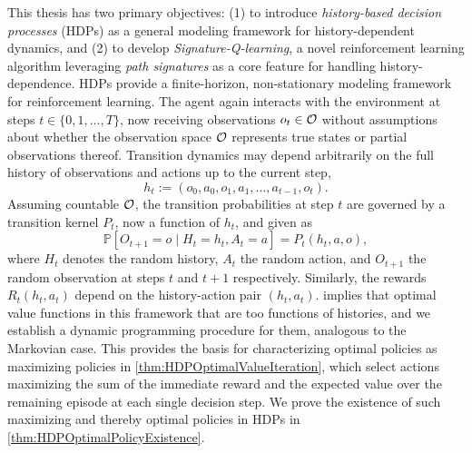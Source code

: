 \documentclass[
    a4paper,
    11pt,
    bibliography=totoc,
    listof=totoc,      
    headinclude=true,
    cleardoublepage=empty,
]{scrbook}
\theoremstyle{plain}
\theoremstyle{definition}
\theoremstyle{remark}
\newcommand{\PM}{\mathbb P}
\newcommand{\SpaceO}{{\cal O}}
\begin{document}
This thesis has two primary objectives: (1) to introduce \textit{history-based 
decision processes} (HDPs) as a general modeling framework for 
history-dependent dynamics, and (2) to develop \textit{Signature-Q-learning}, a 
novel reinforcement learning algorithm leveraging \textit{path signatures} as 
a core feature for handling history-dependence. HDPs provide a finite-horizon, 
non-stationary modeling framework for reinforcement learning. The agent 
again interacts with the 
environment at steps $t\in\{0,1,\dots,T\}$, now receiving observations 
$o_t\in\SpaceO$ without assumptions about whether the observation space 
$\SpaceO$ represents true states or partial observations thereof. Transition 
dynamics may depend arbitrarily on the full history of observations and 
actions up to the current step,
\[
    h_t := (o_0,a_0,o_1,a_1,\dots,a_{t-1},o_t).
\]
Assuming countable $\SpaceO$, the transition probabilities at step $t$ are 
governed by a transition kernel $P_t$, now a function of $h_t$, and given as
\begin{equation}
\label{eq:IntroductionHDPTransition}    
    \PM[O_{t+1}=o \mid H_t=h_t,A_t=a] = P_t(h_t,a,o),
\end{equation}
where $H_t$ denotes the random history, $A_t$ the random action, and $O_{t+1}$ 
the random observation at steps $t$ and $t+1$ respectively. Similarly, the 
rewards $R_t(h_t,a_t)$ depend on the history-action pair $(h_t,a_t)$. 
 implies that optimal value functions in this 
framework that are too functions of histories, and we establish a dynamic 
programming procedure for them, analogous to the Markovian case. This provides 
the basis for characterizing optimal policies as maximizing policies in 
\cref{thm:HDPOptimalValueIteration}, which select actions maximizing the sum of 
the immediate reward and the expected value over the remaining episode at each 
single decision step. We prove the existence of such maximizing and thereby optimal 
policies in HDPs in \cref{thm:HDPOptimalPolicyExistence}. 
\end{document}
